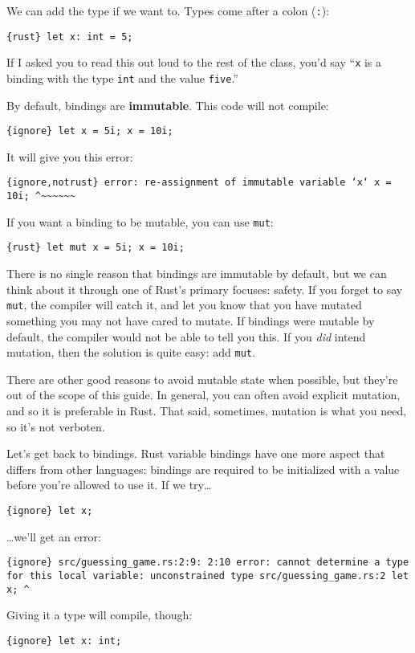 \documentclass[]{article}
\begin{document}
We can add the type if we want to. Types come after a colon
(\texttt{:}):

\texttt{\{rust\} let x: int = 5;}

If I asked you to read this out loud to the rest of the class, you'd say
``\texttt{x} is a binding with the type \texttt{int} and the value
\texttt{five}.''

By default, bindings are \textbf{immutable}. This code will not compile:

\texttt{\{ignore\} let x = 5i; x = 10i;}

It will give you this error:

\texttt{\{ignore,notrust\} error: re-assignment of immutable variable `x`      x = 10i;      \^{}\textasciitilde{}\textasciitilde{}\textasciitilde{}\textasciitilde{}\textasciitilde{}\textasciitilde{}}

If you want a binding to be mutable, you can use \texttt{mut}:

\texttt{\{rust\} let mut x = 5i; x = 10i;}

There is no single reason that bindings are immutable by default, but we
can think about it through one of Rust's primary focuses: safety. If you
forget to say \texttt{mut}, the compiler will catch it, and let you know
that you have mutated something you may not have cared to mutate. If
bindings were mutable by default, the compiler would not be able to tell
you this. If you \emph{did} intend mutation, then the solution is quite
easy: add \texttt{mut}.

There are other good reasons to avoid mutable state when possible, but
they're out of the scope of this guide. In general, you can often avoid
explicit mutation, and so it is preferable in Rust. That said,
sometimes, mutation is what you need, so it's not verboten.

Let's get back to bindings. Rust variable bindings have one more aspect
that differs from other languages: bindings are required to be
initialized with a value before you're allowed to use it. If we
try\ldots{}

\texttt{\{ignore\} let x;}

\ldots{}we'll get an error:

\texttt{\{ignore\} src/guessing\_game.rs:2:9: 2:10 error: cannot determine a type for this local variable: unconstrained type src/guessing\_game.rs:2     let x;                                \^{}}

Giving it a type will compile, though:

\texttt{\{ignore\} let x: int;}
\end{document}
